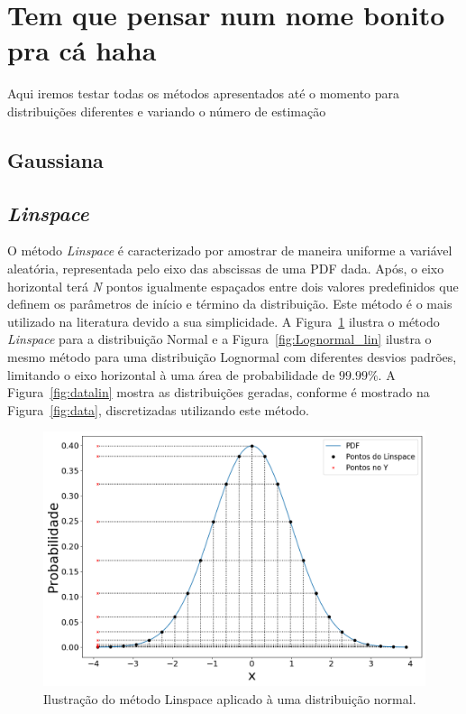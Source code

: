 \section{Tem que pensar num nome bonito pra cá haha}
Aqui iremos testar todas os métodos apresentados até o momento para distribuições diferentes e variando o número de estimação
\subsection{Gaussiana}


\subsection{\textit{Linspace}}
O método \textit{Linspace} é caracterizado por amostrar de maneira uniforme a variável aleatória, representada pelo eixo das abscissas de uma \ac{PDF} dada. Após, o eixo horizontal terá \textit{N} pontos igualmente espaçados entre dois valores predefinidos que definem os parâmetros de início e término da distribuição. Este método é o mais utilizado na literatura devido a sua simplicidade. A Figura~\ref{fig:linspace_curve} ilustra o método \textit{Linspace} para a distribuição Normal e a Figura~\ref{fig:Lognormal_lin} ilustra o mesmo método para uma distribuição Lognormal com diferentes desvios padrões, limitando o eixo horizontal à uma área de probabilidade de $99.99\%$. A Figura~\ref{fig:datalin} mostra as distribuições geradas, conforme é mostrado na Figura~\ref{fig:data}, discretizadas utilizando este método.

\begin{figure}[H]
	\centering
	\includegraphics[width=0.7\linewidth]{./figuras/normal_1}
	\caption{Ilustração do método Linspace aplicado à uma distribuição normal.}
	\label{fig:linspace_curve}
\end{figure}

